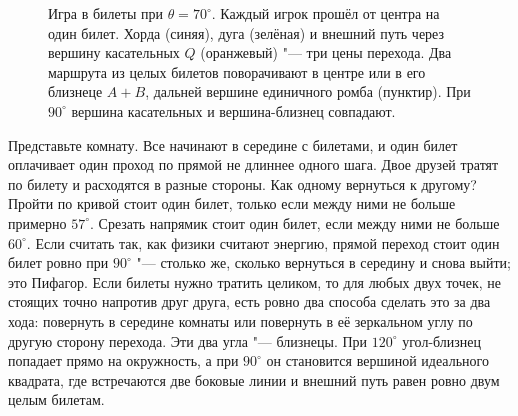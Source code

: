 \begin{figure}[h!]\centering
{}
\caption{Игра в билеты при $\theta=70^\circ$. Каждый игрок прошёл от
центра на один билет. Хорда (синяя), дуга (зелёная) и внешний путь через вершину касательных $Q$
(оранжевый) "--- три цены перехода. Два маршрута из целых билетов поворачивают в
центре или в его близнеце $A+B$, дальней вершине единичного ромба (пунктир). При $90^\circ$
вершина касательных и вершина-близнец совпадают.}
\label{fig:tickets}
\end{figure}

\begin{plain}
Представьте комнату. Все начинают в середине с билетами, и один билет оплачивает один
проход по прямой не длиннее одного шага. Двое друзей тратят по билету и расходятся в
разные стороны. Как одному вернуться к другому? Пройти по кривой стоит один
билет, только если между ними не больше примерно $57^\circ$. Срезать напрямик стоит один
билет, если между ними не больше $60^\circ$. Если считать так, как физики считают энергию,
прямой переход стоит один билет ровно при $90^\circ$ "--- столько же, сколько вернуться в
середину и снова выйти; это Пифагор. Если билеты нужно тратить целиком, то для любых двух точек, не стоящих точно напротив друг друга, есть
ровно два способа сделать это за два хода: повернуть в середине комнаты или повернуть в
её зеркальном углу по другую сторону перехода. Эти два угла "--- близнецы. При
$120^\circ$ угол-близнец попадает прямо на окружность, а при $90^\circ$ он становится
вершиной идеального квадрата, где встречаются две боковые линии и внешний путь равен ровно
двум целым билетам.
\end{plain}
